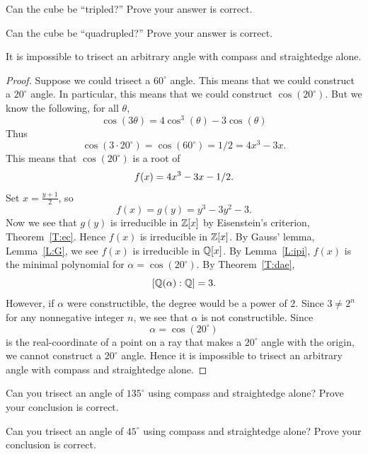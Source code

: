 \documentclass{ximera}
\begin{document}
\begin{exercise}
  Can the cube be ``tripled?'' Prove your answer is correct.
\end{exercise}


\begin{exercise}
  Can the cube be ``quadrupled?'' Prove your answer is correct.
\end{exercise}




\begin{example}
It is impossible to trisect an arbitrary angle with compass and
straightedge alone.
\begin{proof}
  Suppose we could trisect a $60^\circ$ angle. This means that we could
  construct a $20^\circ$ angle. In particular, this means that we could
  construct $\cos(20^\circ)$. But we know the following, for all $\theta$, 
  \[
  \cos(3\theta) =  4\cos^3(\theta) -3 \cos(\theta)
  \]
  Thus
  \[
  \cos(3\cdot20^\circ) = \cos(60^\circ) = 1/2 = 4x^3 -3x.
  \]
  This means that $\cos(20^\circ)$ is a root of
  \[
  f(x)=4x^3 -3x -1/2.\index{4x^3-3x-1/2@$4x^3-3x-1/2$}
  \]
  Set $x = \frac{y+1}{2}$, so
  \[
  f(x) = g(y) = y^3-3y^2-3.
  \]
  Now we see that $g(y)$ is irreducible in $\mathbb Z[x]$ by Eisenstein's
  criterion, Theorem~\ref{T:ec}. Hence $f(x)$ is irreducible in
  $\mathbb Z[x]$. By Gauss' lemma, Lemma~\ref{L:G}, we see $f(x)$ is
  irreducible in $\mathbb Q[x]$.  By Lemma~\ref{L:ipi}, $f(x)$ is the minimal
  polynomial for $\alpha=\cos(20^\circ)$. By Theorem~\ref{T:dae},
  \[
    [\mathbb Q(\alpha):\mathbb Q]=3.
    \]
    However, if $\alpha$ were constructible, the
    degree would be a power of $2$. Since $3\ne 2^n$ for any nonnegative
    integer $n$, we see that $\alpha$ is not constructible. Since
    \[
    \alpha = \cos(20^\circ) 
    \]
    is the real-coordinate of a point on a ray that makes a $20^\circ$
    angle with the origin, we cannot construct a $20^\circ$
    angle. Hence it is impossible to trisect an arbitrary angle with
    compass and straightedge alone.
\end{proof}
\end{example}


\begin{exercise}
  Can you trisect an angle of $135^\circ$ using compass and
  straightedge alone? Prove your conclusion is correct.
\end{exercise}

\begin{exercise}
  Can you trisect an angle of $45^\circ$ using compass and
  straightedge alone? Prove your conclusion is correct.
\end{exercise}
\end{document}
